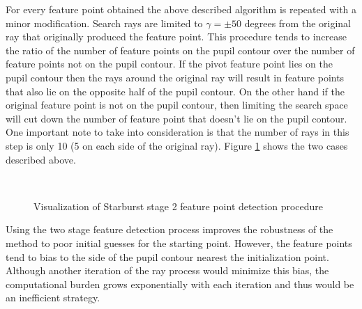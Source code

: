 For every feature point obtained the above described algorithm is repeated with a minor modification. Search rays are limited to $\gamma = \pm 50$ degrees from the original ray that originally produced the feature point. This procedure tends to increase the ratio of the number of feature points on the pupil contour over the number of feature points not on the pupil contour. If the pivot feature point lies on the pupil contour then the rays around the original ray will result in feature points that also lie on the opposite half of the pupil contour. On the other hand if the original feature point is not on the pupil contour, then limiting the search space will cut down the number of feature point that doesn't lie on the pupil contour. One important note to take into consideration is that the number of rays in this step is only 10 (5 on each side of the original ray). Figure \ref{fig:starburst_stage2_example} shows the two cases described above. \bigskip



\begin{figure}[h]
\begin{dBox}
\centering
  \mbox{
   }
   \caption{Visualization of Starburst stage 2 feature point detection procedure \label{fig:starburst_stage2_example} }   
\end{dBox}   
\end{figure}

Using the two stage feature detection process improves the robustness of the method to poor initial guesses for the starting point. However, the feature points tend to bias to the side of the pupil contour nearest the initialization point. Although another iteration of the ray process would minimize this bias, the computational burden grows exponentially with each iteration and thus would be an inefficient strategy. \bigskip

